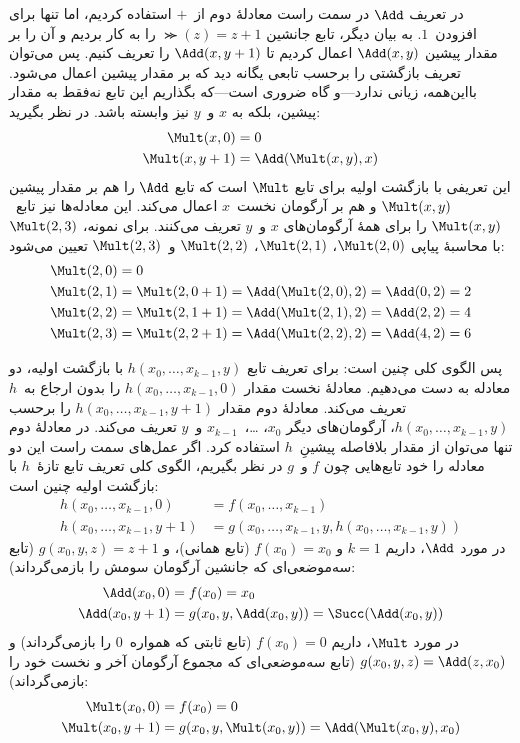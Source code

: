 \documentclass[../../../include/open-logic-section]{subfiles}
\begin{document}
در تعریف $\Add$ در سمت راست معادلهٔ دوم از~$+$ استفاده کردیم، اما
تنها برای افزودن~$1$. به بیان دیگر، تابع جانشین
$\Succ(z)=z+1$ را به کار بردیم و آن را بر مقدار پیشین
$\Add(x,y)$ اعمال کردیم تا $\Add(x,y+1)$ را تعریف کنیم. پس می‌توان
تعریف بازگشتی را برحسب تابعی یگانه دید که بر مقدار پیشین اعمال
می‌شود. بااین‌همه، زیانی ندارد---و گاه ضروری است---که بگذاریم این تابع
نه‌فقط به مقدار پیشین، بلکه به $x$ و~$y$ نیز وابسته باشد. در نظر
بگیرید:
\begin{align*}
  \Mult(x,0) & =  0 \\
  \Mult(x,y+1) & =  \Add(\Mult(x,y),x)
\end{align*}
این تعریفی با بازگشت اولیه برای تابع $\Mult$ است که تابع $\Add$ را
هم بر مقدار پیشین $\Mult(x,y)$ و هم بر آرگومان نخست~$x$ اعمال
می‌کند. این معادله‌ها نیز تابع~$\Mult(x,y)$ را برای همهٔ آرگومان‌های
$x$ و~$y$ تعریف می‌کنند. برای نمونه، $\Mult(2,3)$ با محاسبهٔ پیاپی
$\Mult(2,0)$، $\Mult(2,1)$، $\Mult(2,2)$ و~$\Mult(2,3)$ تعیین
می‌شود:
\begin{align*}
  \Mult(2,0) & = 0\\
  \Mult(2,1) & = \Mult(2,0+1) =
  \Add(\Mult(2,0), 2) = \Add(0, 2) = 2\\
  \Mult(2,2) & = \Mult(2,1+1) =
  \Add(\Mult(2,1), 2) = \Add(2, 2) = 4\\
  \Mult(2,3) & = \Mult(2,2+1) =
  \Add(\Mult(2,2), 2) = \Add(4, 2) = 6
\end{align*}

پس الگوی کلی چنین است: برای تعریف تابع
$h(x_0,\dots,x_{k-1},y)$ با بازگشت اولیه، دو معادله به دست می‌دهیم.
معادلهٔ نخست مقدار $h(x_0,\dots,x_{k-1},0)$ را بدون ارجاع به~$h$
تعریف می‌کند. معادلهٔ دوم مقدار $h(x_0,\dots,x_{k-1},y+1)$ را
برحسب $h(x_0,\dots,x_{k-1},y)$، آرگومان‌های دیگر
$x_0$، \dots،~$x_{k-1}$ و~$y$ تعریف می‌کند. در معادلهٔ دوم تنها
می‌توان از مقدار بلافاصله پیشینِ~$h$ استفاده کرد. اگر عمل‌های سمت
راست این دو معادله را خود تابع‌هایی چون $f$ و~$g$ در نظر بگیریم،
الگوی کلی تعریف تابع تازهٔ~$h$ با بازگشت اولیه چنین است:
\begin{align*}
  h(x_0, \dots, x_{k-1}, 0) & = f(x_0, \dots, x_{k-1})\\
  h(x_0, \dots, x_{k-1}, y+1) & =
  g(x_0, \dots, x_{k-1}, y, h(x_0, \dots, x_{k-1}, y))
\end{align*}
در مورد $\Add$، داریم $k=1$ و $f(x_0)=x_0$ (تابع همانی)، و
$g(x_0,y,z)=z+1$ (تابع سه‌موضعی‌ای که جانشین آرگومان سومش را
بازمی‌گرداند):
\begin{align*}
  \Add(x_0, 0) & = f(x_0) = x_0\\
  \Add(x_0, y+1) & = g(x_0, y, \Add(x_0, y)) =
  \Succ(\Add(x_0, y))
\end{align*}
در مورد $\Mult$، داریم $f(x_0)=0$ (تابع ثابتی که همواره~$0$ را
بازمی‌گرداند) و $g(x_0,y,z)=\Add(z,x_0)$ (تابع سه‌موضعی‌ای که مجموع
آرگومان آخر و نخست خود را بازمی‌گرداند):
\begin{align*}
  \Mult(x_0,0) & =  f(x_0) = 0 \\
  \Mult(x_0,y+1) & =  g(x_0, y, \Mult(x_0,y)) =
  \Add(\Mult(x_0,y), x_0)
\end{align*}
\end{document}
